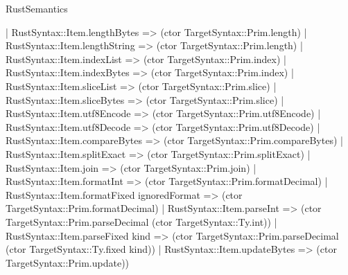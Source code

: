\begin{lexlean}{RustSemantics}
\begin{semanticmodule}
{    | RustSyntax::Item.lengthBytes => (ctor TargetSyntax::Prim.length)
    | RustSyntax::Item.lengthString => (ctor TargetSyntax::Prim.length)
    | RustSyntax::Item.indexList => (ctor TargetSyntax::Prim.index)
    | RustSyntax::Item.indexBytes => (ctor TargetSyntax::Prim.index)
    | RustSyntax::Item.sliceList => (ctor TargetSyntax::Prim.slice)
    | RustSyntax::Item.sliceBytes => (ctor TargetSyntax::Prim.slice)
    | RustSyntax::Item.utf8Encode => (ctor TargetSyntax::Prim.utf8Encode)
    | RustSyntax::Item.utf8Decode => (ctor TargetSyntax::Prim.utf8Decode)
    | RustSyntax::Item.compareBytes => (ctor TargetSyntax::Prim.compareBytes)
    | RustSyntax::Item.splitExact => (ctor TargetSyntax::Prim.splitExact)
    | RustSyntax::Item.join => (ctor TargetSyntax::Prim.join)
    | RustSyntax::Item.formatInt => (ctor TargetSyntax::Prim.formatDecimal)
    | RustSyntax::Item.formatFixed ignoredFormat => (ctor TargetSyntax::Prim.formatDecimal)
    | RustSyntax::Item.parseInt => (ctor TargetSyntax::Prim.parseDecimal (ctor TargetSyntax::Ty.int))
    | RustSyntax::Item.parseFixed kind => (ctor TargetSyntax::Prim.parseDecimal (ctor TargetSyntax::Ty.fixed kind))
    | RustSyntax::Item.updateBytes => (ctor TargetSyntax::Prim.update))
}


\end{semanticmodule}
\end{lexlean}
